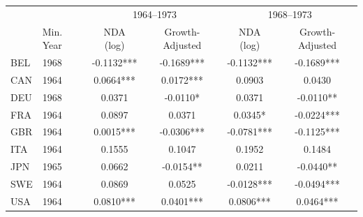 \begin{tabular}{llcccc}
\toprule
 & & \multicolumn{2}{c}{1964--1973} & \multicolumn{2}{c}{1968--1973} \\
 & Min. Year & NDA (log) & Growth-Adjusted & NDA (log) & Growth-Adjusted \\
\midrule
 BEL & 1968 & -0.1132*** & -0.1689*** & -0.1132*** & -0.1689*** \\ 
 CAN & 1964 & 0.0664*** & 0.0172*** & 0.0903 & 0.0430 \\ 
 DEU & 1968 & 0.0371 & -0.0110* & 0.0371 & -0.0110** \\ 
 FRA & 1964 & 0.0897 & 0.0371 & 0.0345* & -0.0224*** \\ 
 GBR & 1964 & 0.0015*** & -0.0306*** & -0.0781*** & -0.1125*** \\ 
 ITA & 1964 & 0.1555 & 0.1047 & 0.1952 & 0.1484 \\ 
 JPN & 1965 & 0.0662 & -0.0154** & 0.0211 & -0.0440** \\ 
 SWE & 1964 & 0.0869 & 0.0525 & -0.0128*** & -0.0494*** \\ 
\midrule
 USA & 1964 & 0.0810*** & 0.0401*** & 0.0806*** & 0.0464*** \\ 
\bottomrule
\end{tabular}
